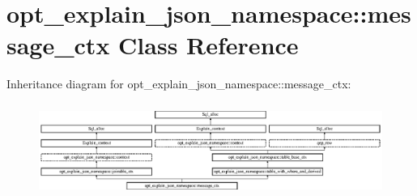 \hypertarget{classopt__explain__json__namespace_1_1message__ctx}{}\section{opt\+\_\+explain\+\_\+json\+\_\+namespace\+:\+:message\+\_\+ctx Class Reference}
\label{classopt__explain__json__namespace_1_1message__ctx}
Inheritance diagram for opt\+\_\+explain\+\_\+json\+\_\+namespace\+:\+:message\+\_\+ctx\+:\begin{figure}[H]
\begin{center}
\leavevmode
\includegraphics[height=3.051771cm]{classopt__explain__json__namespace_1_1message__ctx}
\end{center}
\end{figure}
